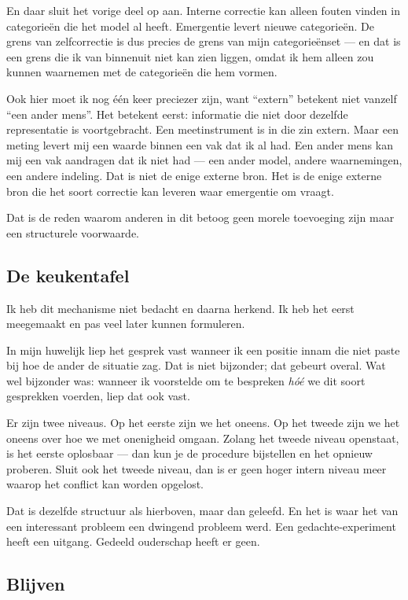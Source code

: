 \documentclass[11pt,a4paper]{article}
\begin{document}
En daar sluit het vorige deel op aan. Interne correctie kan alleen fouten vinden in categorieën die het model al heeft. Emergentie levert nieuwe categorieën. De grens van zelfcorrectie is dus precies de grens van mijn categorieënset --- en dat is een grens die ik van binnenuit niet kan zien liggen, omdat ik hem alleen zou kunnen waarnemen met de categorieën die hem vormen.

Ook hier moet ik nog één keer preciezer zijn, want \enquote{extern} betekent niet vanzelf \enquote{een ander mens}. Het betekent eerst: informatie die niet door dezelfde representatie is voortgebracht. Een meetinstrument is in die zin extern. Maar een meting levert mij een waarde binnen een vak dat ik al had. Een ander mens kan mij een vak aandragen dat ik niet had --- een ander model, andere waarnemingen, een andere indeling. Dat is niet de enige externe bron. Het is de enige externe bron die het soort correctie kan leveren waar emergentie om vraagt.

Dat is de reden waarom anderen in dit betoog geen morele toevoeging zijn maar een structurele voorwaarde.

\subsection*{De keukentafel}

Ik heb dit mechanisme niet bedacht en daarna herkend. Ik heb het eerst meegemaakt en pas veel later kunnen formuleren.

In mijn huwelijk liep het gesprek vast wanneer ik een positie innam die niet paste bij hoe de ander de situatie zag. Dat is niet bijzonder; dat gebeurt overal. Wat wel bijzonder was: wanneer ik voorstelde om te bespreken \textit{hóé} we dit soort gesprekken voerden, liep dat ook vast.

Er zijn twee niveaus. Op het eerste zijn we het oneens. Op het tweede zijn we het oneens over hoe we met onenigheid omgaan. Zolang het tweede niveau openstaat, is het eerste oplosbaar --- dan kun je de procedure bijstellen en het opnieuw proberen. Sluit ook het tweede niveau, dan is er geen hoger intern niveau meer waarop het conflict kan worden opgelost.

Dat is dezelfde structuur als hierboven, maar dan geleefd. En het is waar het van een interessant probleem een dwingend probleem werd. Een gedachte-experiment heeft een uitgang. Gedeeld ouderschap heeft er geen.

\subsection*{Blijven}
\end{document}
